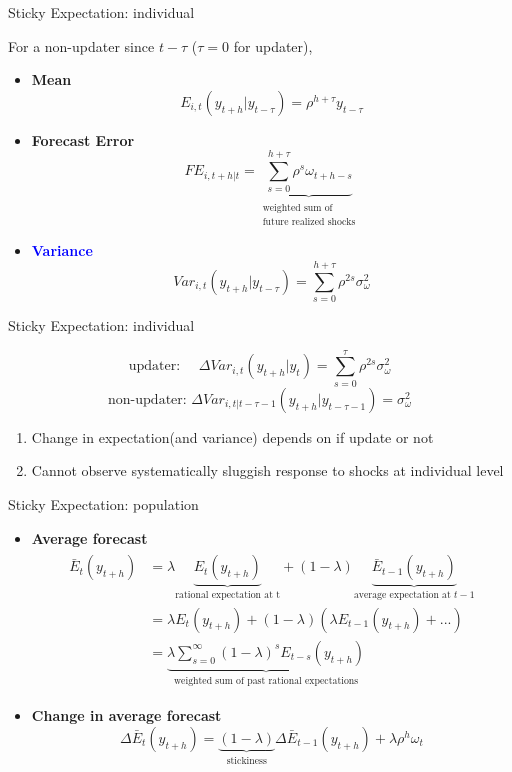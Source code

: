 \documentclass{beamer}
\begin{document}
\begin{frame}{Sticky Expectation: individual}

For a non-updater since $t-\tau$ ($\tau=0$ for updater),
\begin{itemize}
\item \textbf{Mean} $$E_{i,t}(y_{t+h}|y_{t-\tau}) = \rho^{h+\tau} y_{t-\tau}$$  
\item \textbf{Forecast Error} $$FE_{i,t+h|t} = \underbrace{\sum^{h+\tau}_{s=0} \rho^s \omega_{t+h-s}}_{\substack{\text{weighted sum of} \\ \text{future realized shocks}} }$$
\item \textcolor{blue}{\textbf{Variance}} $$Var_{i,t}(y_{t+h}|y_{t-\tau}) = \sum^{h+\tau}_{s=0}\rho^{2s} \sigma^2_{\omega}$$	
\end{itemize}

\end{frame}


\begin{frame}{Sticky Expectation: individual}

$$\text{updater: } \quad \Delta Var_{i,t}(y_{t+h}|y_t)= \sum^{\tau}_{s=0} \rho^{2s}\sigma^2_{\omega}$$
$$\text{non-updater: }  \Delta Var_{i,t|t-\tau-1}(y_{t+h}|y_{t-\tau-1})  = \sigma^2_{\omega}$$


\begin{enumerate}
\item Change in expectation(and variance) depends on if update or not 
\item Cannot observe systematically sluggish response to shocks at individual level 
\end{enumerate}

\end{frame}



\begin{frame}{Sticky Expectation: population}
\begin{itemize}
	\item \textbf{Average forecast} 
	\begin{eqnarray*}
		\begin{aligned}
			\bar E_t(y_{t+h}) & = \lambda \underbrace{E_t(y_{t+h})}_{\text{rational expectation at t}} + (1-\lambda) \underbrace{\bar E_{t-1}(y_{t+h})}_{\text{average expectation at } t-1} \\
			& = \lambda E_t(y_{t+h}) + (1-\lambda) (\lambda E_{t-1}(y_{t+h})+ ...) \\
			& =\underbrace{ \lambda \sum^{\infty}_{s=0} (1-\lambda)^s E_{t-s}(y_{t+h})}_{\text{weighted sum of past rational expectations}}
		\end{aligned}
	\end{eqnarray*}
	\item \textbf{Change in average forecast}
	$$\Delta \bar E_t(y_{t+h})=\underbrace{(1-\lambda)}_{\text{stickiness}} \Delta \bar E_{t-1}(y_{t+h}) + \lambda \rho^h \omega_t$$ 
\end{itemize}
\end{frame}
\end{document}
